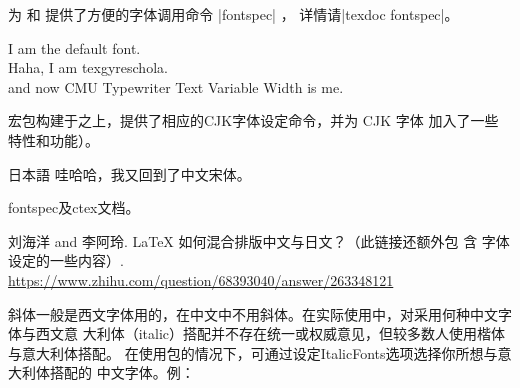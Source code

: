 
为 \XeLaTeX{} 和 \LuaLaTeX{} 提供了方便的字体调用命令 |fontspec| ，
详情请|texdoc fontspec|。
\begin{texlist}
  \newfontfamily{}

  I am the default font. \\
   Haha, I am texgyreschola. \\
  \fontCMUtv and now CMU Typewriter Text Variable Width is me.
\end{texlist}

宏包构建于之上，提供了相应的CJK字体设定命令，并为 CJK 字体
加入了一些特性和功能）。
\begin{texlist}


  \newCJKfontfamily{} %
  \gothic 日本語
  \songti 哇哈哈，我又回到了中文宋体。
\end{texlist}

\begin{reference}
  \item fontspec及ctex文档。
  \item 刘海洋 and 李阿玲. \LaTeX{} 如何混合排版中文与日文？（此链接还额外包
    含\pTeX{} 字体设定的一些内容）.
    \url{https://www.zhihu.com/question/68393040/answer/263348121}
\end{reference}



斜体一般是西文字体用的，在中文中不用斜体。在实际使用中，对采用何种中文字体与西文意
大利体（italic）搭配并不存在统一或权威意见，但较多数人使用楷体与意大利体搭配。
在使用包的情况下，可通过设定ItalicFonts选项选择你所想与意大利体搭配的
中文字体。例：
\begin{texlist}
\end{texlist}

